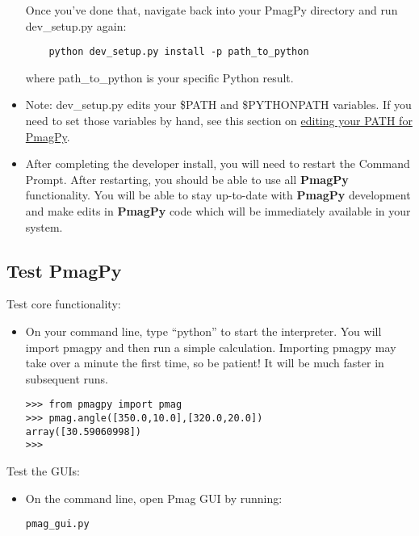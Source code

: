 \documentclass[11pt]{article}
\begin{document}
\begin{itemize}
Once you've done that, navigate back into your PmagPy directory and run dev\_setup.py again:

\begin{verbatim}
    python dev_setup.py install -p path_to_python
\end{verbatim}

where path\_to\_python is your specific Python result.

\item Note: dev\_setup.py edits your \$PATH and \$PYTHONPATH variables.  If you need to set those variables by hand, see this section on \href{https://earthref.org/PmagPy/cookbook/#setting_path}{editing your PATH for PmagPy}.

\item After completing the developer install, you will need to restart the Command Prompt.  After restarting, you should be able to use all {\bf PmagPy} functionality.  You will be able to stay up-to-date with {\bf PmagPy} development and make edits in {\bf PmagPy} code which will be immediately available in your system.

\end{itemize}

\subsection{Test PmagPy}

Test core functionality:

\begin{itemize}
  \item On your command line, type ``python'' to start the interpreter.  You will import pmagpy and then run a simple calculation.  Importing pmagpy may take over a minute the first time, so be patient!  It will be much faster in subsequent runs.

\begin{verbatim}
>>> from pmagpy import pmag
>>> pmag.angle([350.0,10.0],[320.0,20.0])
array([30.59060998])
>>>
\end{verbatim}

\end{itemize}

Test the GUIs:

\begin{itemize}
\item  On the command line, open Pmag GUI by running:

\begin{verbatim}
pmag_gui.py
\end{verbatim}

\end{itemize}
\end{document}
